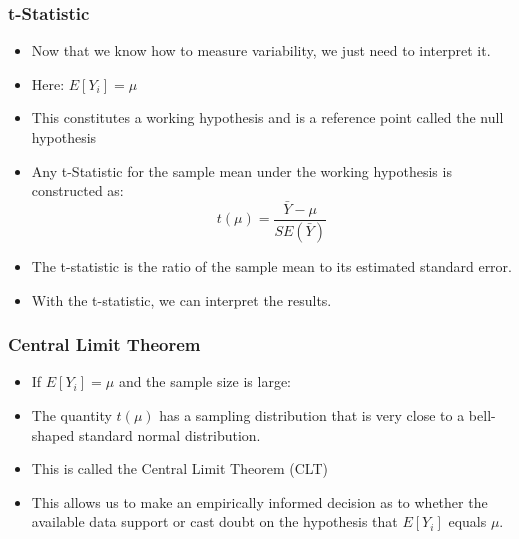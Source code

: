 \documentclass{beamer}
\begin{document}
\begin{frame}
\frametitle{t-Statistic}

\begin{itemize}
	\item Now that we know how to measure variability, we just need to interpret it.
	\item Here: $E[Y_i]=\mu$
	\item This constitutes a working hypothesis and is a reference point called the null hypothesis
	\item Any t-Statistic for the sample mean under the working hypothesis is constructed as:\\
		$$t(\mu)=\frac{\bar{Y}-\mu}{SE(\bar{Y})}$$
	\item The t-statistic is the ratio of the sample mean to its estimated standard error.
	\item With the t-statistic, we can interpret the results.
\end{itemize}

\end{frame}


\begin{frame}
\frametitle{Central Limit Theorem}
\begin{itemize}
	\item If $E[Y_i]=\mu$ and the sample size is large:
	\item The quantity ${t(\mu)}$ has a sampling distribution that is very close to a bell-shaped standard normal distribution. \\
	\item This is called the Central Limit Theorem (CLT)
	\item This allows us to make an empirically informed decision as to whether the available
data support or cast doubt on the hypothesis that $E[Y_i]$ equals $\mu$.
\end{itemize}

\end{frame}

\end{document}
